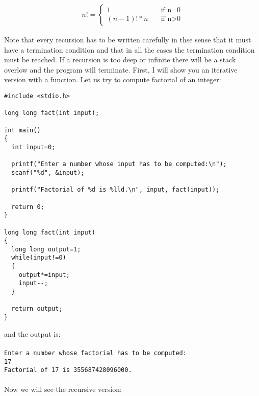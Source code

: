 $$\begin{array}{rl}n!=\left\{\begin{array}{ll}1&\hspace{1em}\text{if
    n=0}\\[4pt](n-1)!\ast n&\hspace{1em}\text{if
    n>0}\end{array}\right.\end{array}$$

Note that every recursion has to be written carefully in thse sense that it
must have a termination condition and that in all the cases the termination
condition must be reached. If a recursion is too deep or infinite there will be
a stack overlow and the program will terminate. First, I will show you an
iterative version with a function. Let us try to compute factorial of an
integer:

\begin{verbatim}
#include <stdio.h>

long long fact(int input);

int main()
{
  int input=0;

  printf("Enter a number whose input has to be computed:\n");
  scanf("%d", &input);

  printf("Factorial of %d is %lld.\n", input, fact(input));

  return 0;
}

long long fact(int input)
{
  long long output=1;
  while(input!=0)
  {
    output*=input;
    input--;
  }

  return output;
}
\end{verbatim}
and the output is:
\\\\\texttt{Enter a number whose factorial has to be computed:\\
17\\
Factorial of 17 is 355687428096000.\\\\}
Now we will see the recursive version:

